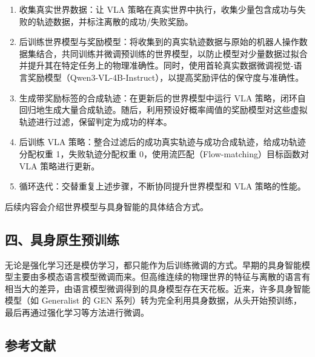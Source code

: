 \begin{enumerate}
\def\labelenumi{\arabic{enumi}.}
\tightlist
\item
  收集真实世界数据：让 VLA 策略在真实世界中执行，收集少量包含成功与失败的轨迹数据，并标注离散的成功/失败奖励。
\item
  后训练世界模型与奖励模型：将收集到的真实轨迹数据与原始的机器人操作数据集结合，共同训练并微调预训练的世界模型，以防止模型对少量数据过拟合并提升其在特定任务上的物理准确性。同时，使用首轮真实数据微调视觉-语言奖励模型（Qwen3-VL-4B-Instruct），以提高奖励评估的保守度与准确性。
\item
  生成带奖励标签的合成轨迹：在更新后的世界模型中运行 VLA 策略，闭环自回归地生成大量合成轨迹。随后，利用预设好概率阈值的奖励模型对这些虚拟轨迹进行过滤，保留判定为成功的样本。
\item
  后训练 VLA 策略：整合过滤后的成功真实轨迹与成功合成轨迹，给成功轨迹分配权重 1，失败轨迹分配权重 0，使用流匹配（Flow-matching）目标函数对 VLA 策略进行更新。
\item
  循环迭代：交替重复上述步骤，不断协同提升世界模型和 VLA 策略的性能。
\end{enumerate}

后续内容会介绍世界模型与具身智能的具体结合方式。

\hypertarget{ux56dbux5177ux8eabux539fux751fux9884ux8badux7ec3}{%
\subsection{四、具身原生预训练}\label{ux56dbux5177ux8eabux539fux751fux9884ux8badux7ec3}}

无论是强化学习还是模仿学习，都只能作为后训练微调的方式。早期的具身智能模型主要由多模态语言模型微调而来。但高维连续的物理世界的特征与离散的语言有相当大的差异，由语言模型微调得到的具身模型存在天花板。近来，许多具身智能模型（如 Generalist 的 GEN 系列）转为完全利用具身数据，从头开始预训练，最后再通过强化学习等方法进行微调。

\hypertarget{ux53c2ux8003ux6587ux732e-151}{%
\subsection{参考文献}\label{ux53c2ux8003ux6587ux732e-151}}

